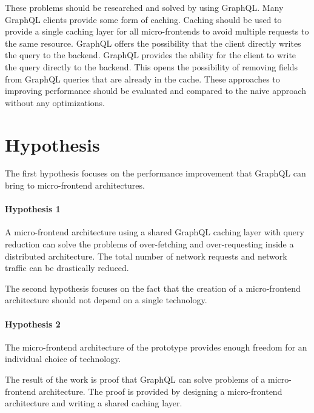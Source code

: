 \bigskip

\noindent These problems should be researched and solved by using GraphQL. Many GraphQL clients provide some form of caching. Caching should be used to provide a single caching layer for all micro-frontends to avoid multiple requests to the same resource. GraphQL offers the possibility that the client directly writes the query to the backend. GraphQL provides the ability for the client to write the query directly to the backend. This opens the possibility of removing fields from GraphQL queries that are already in the cache. These approaches to improving performance should be evaluated and compared to the naive approach without any optimizations.

\section{Hypothesis}\label{section:introduction:hypothesis}

The first hypothesis focuses on the performance improvement that GraphQL can bring to micro-frontend architectures.

\paragraph{Hypothesis 1} 
A micro-frontend architecture using a shared GraphQL caching layer with query reduction can solve the problems of over-fetching and over-requesting inside a distributed architecture. The total number of network requests and network traffic can be drastically reduced.

\bigskip

\noindent The second hypothesis focuses on the fact that the creation of a micro-frontend architecture should not depend on a single technology.

\paragraph{Hypothesis 2}
The micro-frontend architecture of the prototype provides enough freedom for an individual choice of technology.

\bigskip

\noindent The result of the work is proof that GraphQL can solve problems of a micro-frontend architecture. The proof is provided by designing a micro-frontend architecture and writing a shared caching layer.
